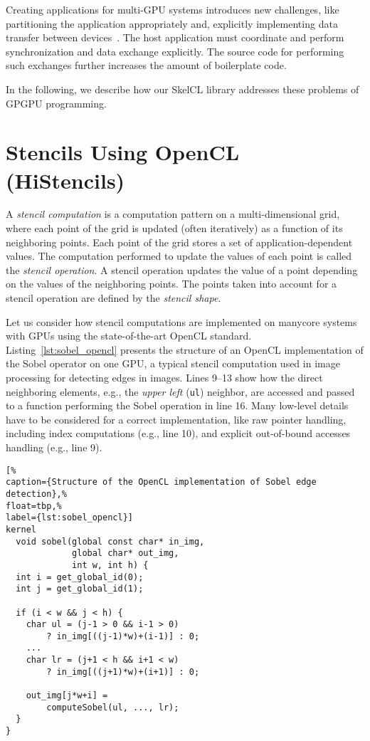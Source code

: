 Creating applications for multi-GPU systems introduces new challenges, like partitioning the application appropriately and, explicitly implementing data transfer between devices~\cite{ScVG-08}.
The host application must coordinate and perform synchronization and data exchange explicitly.
The source code for performing such exchanges further increases the amount of boilerplate code.

In the following, we describe how our SkelCL library addresses these problems of GPGPU programming.


\section{Stencils Using OpenCL (HiStencils)}
\label{sec:background}

A \emph{stencil computation} is a computation pattern on a multi-dimensional grid, where each point of the grid is updated (often iteratively) as a function of its neighboring points.
Each point of the grid stores a set of application-dependent values.
The computation performed to update the values of each point is called the \emph{stencil operation}.
A stencil operation updates the value of a point depending on the values of the neighboring points.
The points taken into account for a stencil operation are defined by the \emph{stencil shape}.

Let us consider how stencil computations are implemented on manycore systems with GPUs using the state-of-the-art OpenCL standard.
Listing~\ref{lst:sobel_opencl} presents the structure of an OpenCL implementation of the Sobel operator on one GPU, a typical stencil computation used in image processing for detecting edges in images.
Lines 9--13 show how the direct neighboring elements, e.g., the \emph{upper left} (\texttt{ul}) neighbor, are accessed and passed to a function performing the Sobel operation in line 16.
Many low-level details have to be considered for a correct implementation, like raw pointer handling, including index computations (e.g., line 10), and explicit out-of-bound  accesses handling (e.g., line 9).

\begin{lstlisting}[%
caption={Structure of the OpenCL implementation of Sobel edge detection},%
float=tbp,%
label={lst:sobel_opencl}]
kernel
  void sobel(global const char* in_img,
             global char* out_img,
             int w, int h) {
  int i = get_global_id(0);
  int j = get_global_id(1);

  if (i < w && j < h) {
    char ul = (j-1 > 0 && i-1 > 0)
        ? in_img[((j-1)*w)+(i-1)] : 0;
    ...
    char lr = (j+1 < h && i+1 < w)
        ? in_img[((j+1)*w)+(i+1)] : 0;

    out_img[j*w+i] =
        computeSobel(ul, ..., lr);
  }
}
\end{lstlisting}


